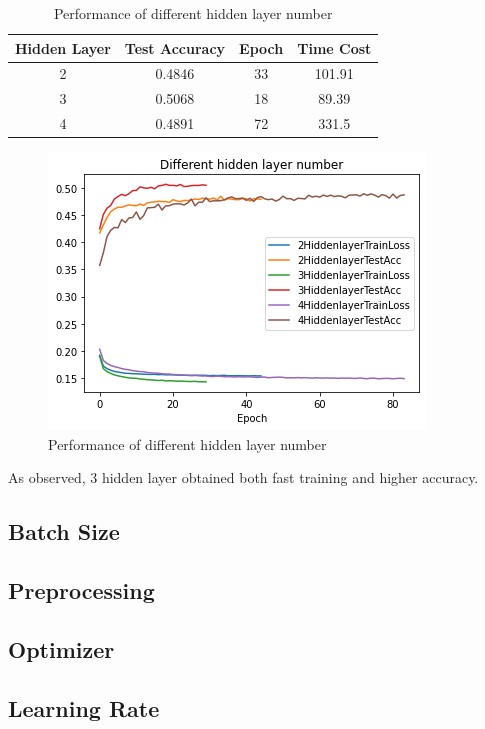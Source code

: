 \documentclass{article}[12pt]
\begin{document}
\begin{table}[h]\label{tab:table}
    \centering
    \begin{tabular}{|c|c|c|c|}
        \hline
        Hidden Layer & Test Accuracy & Epoch & Time Cost\\\hline
        2 & 0.4846 & 33 & 101.91\\\hline
        3 & 0.5068 & 18 & 89.39\\\hline
        4 & 0.4891 & 72 & 331.5\\\hline
        \hline
    \end{tabular}
    \caption{Performance of different hidden layer number}
\end{table}

\begin{figure}
    \centering
    \includegraphics[scale=0.5]{Figures/1.Hiddenlayers/download}
    \caption{Performance of different hidden layer number}
\end{figure}

    As observed, 3 hidden layer obtained both fast training and higher accuracy.

\subsection{Batch Size}

\subsection{Preprocessing}

\subsection{Optimizer}

\subsection{Learning Rate}
\end{document}
